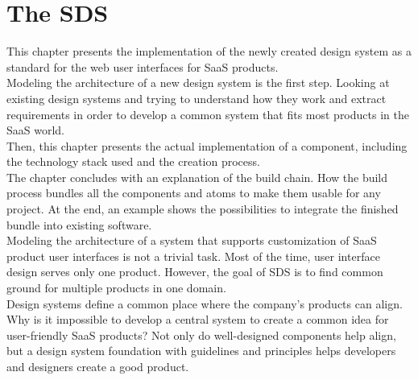 \newpage

\section{The \acf{SDS}}\label{saas_design_system}
This chapter presents the implementation of the newly created design system as a standard for the web user interfaces for \ac{SaaS} products. \\
Modeling the architecture of a new design system is the first step. Looking at existing design systems and trying to understand how they work and extract requirements in order to develop a common system that fits most products in the \ac{SaaS} world. \\
Then, this chapter presents the actual implementation of a component, including the technology stack used and the creation process. \\
The chapter concludes with an explanation of the build chain. How the build process bundles all the components and atoms to make them usable for any project. At the end, an example shows the possibilities to integrate the finished bundle into existing software.\\
Modeling the architecture of a system that supports customization of \ac{SaaS} product user interfaces is not a trivial task. Most of the time, user interface design serves only one product. However, the goal of \ac{SDS} is to find common ground for multiple products in one domain. \\
Design systems define a common place where the company's products can align. Why is it impossible to develop a central system to create a common idea for user-friendly \ac{SaaS} products? Not only do well-designed components help align, but a design system foundation with guidelines and principles helps developers and designers create a good product. \\




